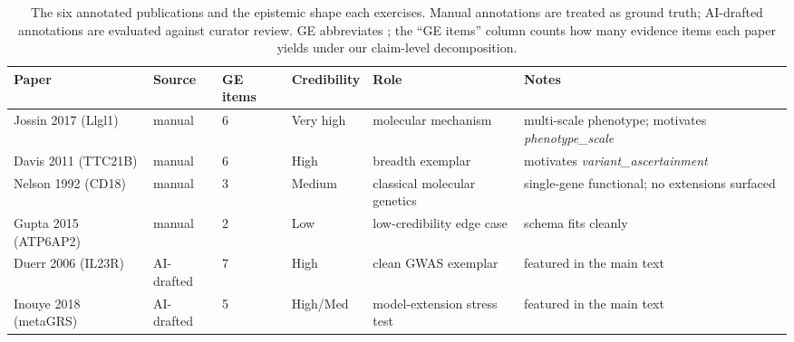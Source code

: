 
\begin{table}[H]
    \centering
    \caption{The six annotated publications and the epistemic shape each
    exercises. Manual annotations are treated as ground truth; AI-drafted
    annotations are evaluated against curator review. GE abbreviates
    \GeneticEvidence{}; the ``GE items'' column counts how many evidence
    items each paper yields under our claim-level decomposition.}
    \label{tab:corpus}
    \small
    \begin{tabularx}{\linewidth}{@{}lllllX@{}}
\toprule
Paper & Source & GE items & Credibility & Role & Notes \\
\midrule
Jossin 2017 (Llgl1)   & manual       & 6 & Very high & molecular mechanism           & multi-scale phenotype; motivates \emph{phenotype\_scale} \\
Davis 2011 (TTC21B)   & manual       & 6 & High      & breadth exemplar              & motivates \emph{variant\_ascertainment} \\
Nelson 1992 (CD18)    & manual       & 3 & Medium    & classical molecular genetics  & single-gene functional; no extensions surfaced \\
Gupta 2015 (ATP6AP2)  & manual       & 2 & Low       & low-credibility edge case     & schema fits cleanly \\
Duerr 2006 (IL23R)    & AI-drafted   & 7 & High      & clean GWAS exemplar           & featured in the main text \\
Inouye 2018 (metaGRS) & AI-drafted   & 5 & High/Med  & model-extension stress test   & featured in the main text \\
\bottomrule
    \end{tabularx}
\end{table}


